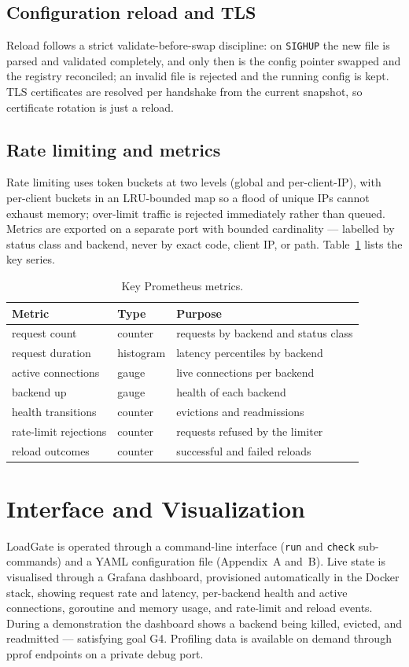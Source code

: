 \documentclass[11pt,a4paper]{report}
\newcommand{\code}[1]{\texttt{#1}}
\begin{document}
\subsection{Configuration reload and TLS}
Reload follows a strict validate-before-swap discipline: on \code{SIGHUP} the new file is parsed
and validated completely, and only then is the config pointer swapped and the registry
reconciled; an invalid file is rejected and the running config is kept. TLS certificates are
resolved per handshake from the current snapshot, so certificate rotation is just a reload.

\subsection{Rate limiting and metrics}
Rate limiting uses token buckets at two levels (global and per-client-IP), with per-client
buckets in an LRU-bounded map so a flood of unique IPs cannot exhaust memory; over-limit traffic
is rejected immediately rather than queued. Metrics are exported on a separate port with bounded
cardinality --- labelled by status class and backend, never by exact code, client IP, or path.
Table~\ref{tab:metrics} lists the key series.

\begin{table}[htbp]
\centering
\caption{Key Prometheus metrics.}
\label{tab:metrics}
\begin{tabular}{lll}
\toprule
\textbf{Metric} & \textbf{Type} & \textbf{Purpose}\\
\midrule
request count & counter & requests by backend and status class\\
request duration & histogram & latency percentiles by backend\\
active connections & gauge & live connections per backend\\
backend up & gauge & health of each backend\\
health transitions & counter & evictions and readmissions\\
rate-limit rejections & counter & requests refused by the limiter\\
reload outcomes & counter & successful and failed reloads\\
\bottomrule
\end{tabular}
\end{table}

\section{Interface and Visualization}
LoadGate is operated through a command-line interface (\code{run} and \code{check}
sub-commands) and a YAML configuration file (Appendix~A and~B). Live state is visualised through
a Grafana dashboard, provisioned automatically in the Docker stack, showing request rate and
latency, per-backend health and active connections, goroutine and memory usage, and rate-limit
and reload events. During a demonstration the dashboard shows a backend being killed, evicted,
and readmitted --- satisfying goal G4. Profiling data is available on demand through pprof
endpoints on a private debug port.
\end{document}
